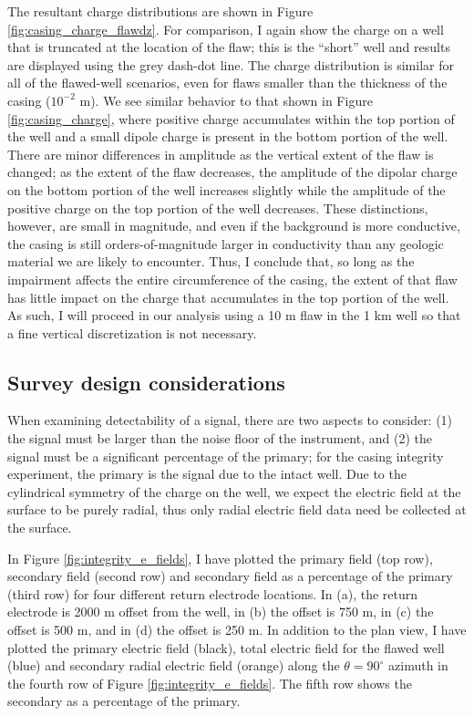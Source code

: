 The resultant charge distributions are shown in Figure \ref{fig:casing_charge_flawdz}. For comparison, I again show the charge on a well that is truncated at the location of the flaw; this is the  ``short'' well and results are displayed using the grey dash-dot line. The charge distribution is similar for all of the flawed-well scenarios, even for flaws smaller than the thickness of the casing ($10^{-2}$ m). We see similar behavior to that shown in Figure \ref{fig:casing_charge}, where positive charge accumulates within the top portion of the well and a small dipole charge is present in the bottom portion of the well. There are minor differences in amplitude as the vertical extent of the flaw is changed; as the extent of the flaw decreases, the amplitude of the dipolar charge on the bottom portion of the well increases slightly while the amplitude of the positive charge on the top portion of the well decreases. These distinctions, however, are small in magnitude, and even if the background is more conductive, the casing is still orders-of-magnitude larger in conductivity than any geologic material we are likely to encounter. Thus, I conclude that, so long as the impairment affects the entire circumference of the casing, the extent of that flaw has little impact on the charge that accumulates in the top portion of the well. As such, I will proceed in our analysis using a 10 m flaw in the 1 km well so that a fine vertical discretization is not necessary.




\subsection{Survey design considerations}

When examining detectability of a signal, there are two aspects to consider: (1) the signal must be larger than the noise floor of the instrument, and (2) the signal must be a significant percentage of the primary; for the casing integrity experiment, the primary is the signal due to the intact well. Due to the cylindrical symmetry of the charge on the well, we expect the electric field at the surface to be purely radial, thus only radial electric field data need be collected at the surface.

In Figure \ref{fig:integrity_e_fields}, I have plotted the primary field (top row), secondary field (second row) and secondary field as a percentage of the primary (third row) for four different return electrode locations. In (a), the return electrode is 2000 m offset from the well, in (b) the offset is 750 m, in (c) the offset is 500 m, and in (d) the offset is 250 m. In addition to the plan view, I have plotted the primary electric field (black),  total electric field for the flawed well (blue) and secondary radial electric field (orange) along the $\theta = 90^\circ$ azimuth in the fourth row of Figure \ref{fig:integrity_e_fields}. The fifth row shows the secondary as a percentage of the primary.




